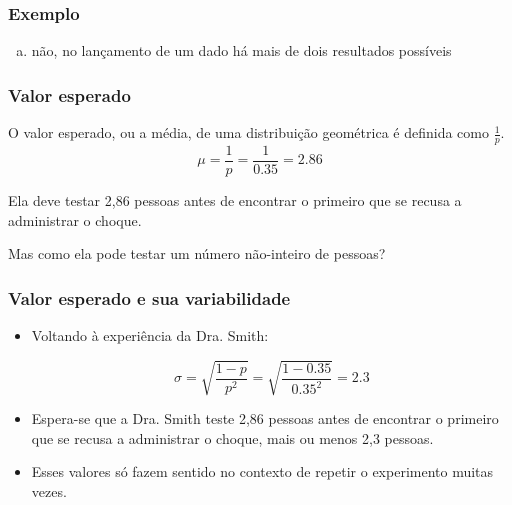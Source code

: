 \begin{frame}
\frametitle{Exemplo}
\justifying
{}

\begin{enumerate}[(a)]
\justifying
\item não, no lançamento de um dado há mais de dois resultados possíveis
\justifying
{}
\justifying
{}
\end{enumerate}


\end{frame}


\begin{frame}
\frametitle{Valor esperado}
\justifying
{}

\pause
\justifying
O valor esperado, ou a média, de uma distribuição geométrica é definida como $\frac{1}{p}$.
\[ \mu = \frac{1}{p} = \frac{1}{0.35} = 2.86 \]

\pause
\justifying
Ela deve testar 2,86 pessoas antes de encontrar o primeiro que se recusa a administrar o choque.

\pause
\justifying
Mas como ela pode testar um número não-inteiro de pessoas?

\end{frame}


\begin{frame}
\frametitle{Valor esperado e sua variabilidade}
\justifying
{}

\pause

\begin{itemize}
\justifying
\item Voltando à experiência da Dra. Smith:

\[ \sigma = \sqrt{\frac{1-p}{p^2}} = \sqrt{\frac{1-0.35}{0.35^2}} = 2.3 \]

\pause
\justifying
\item Espera-se que a Dra. Smith teste 2,86 pessoas antes de encontrar o primeiro que se recusa a administrar o choque, mais ou menos 2,3 pessoas.

\pause
\justifying
\item Esses valores só fazem sentido no contexto de repetir o experimento muitas vezes.

\end{itemize}

\end{frame}



